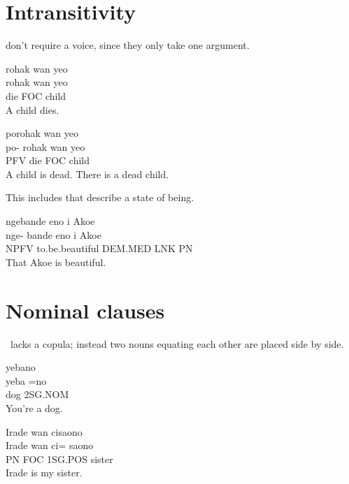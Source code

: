 \section{Intransitivity}
 don't require a voice, since they only take one argument.
\begin{examples}
	\ex
	\label{ex:the_child_dies}
	\script rohak wan yeo \\
	\bits rohak wan yeo \\
	\gloss die FOC child \\
	\tr A child dies.
\end{examples}

\begin{examples}
	\ex
	\label{ex:dead_child}
	\script porohak wan yeo \\
	\bits po- rohak wan yeo \\
	\gloss PFV die FOC child \\
	\tr A child is dead.
	\tr There is a dead child.
\end{examples}

This includes  that describe a state of being.
\begin{examples}
	\ex
	\label{ex:akoe_beautiful}
	\script ngebande eno i Akoe  \\
	\bits nge- bande eno i Akoe  \\
	\gloss NPFV to.be.beautiful DEM.MED LNK PN \\
	\tr That Akoe is beautiful.
\end{examples}

\section{Nominal clauses}
\langname~lacks a copula; instead two nouns equating each other are placed side by side.
\begin{examples}
	\ex
	\label{ex:you_bitch}
	\script yebano \\
	\bits yeba =no \\
	\gloss dog 2SG.NOM \\
	\tr You're a dog.
\end{examples}
\begin{examples}
	\ex
	\label{ex:my_sister}
	\script Irade wan cisaono \\
	\bits Irade wan ci= saono  \\
	\gloss PN FOC 1SG.POS sister \\
	\tr Irade is my sister.
\end{examples}

